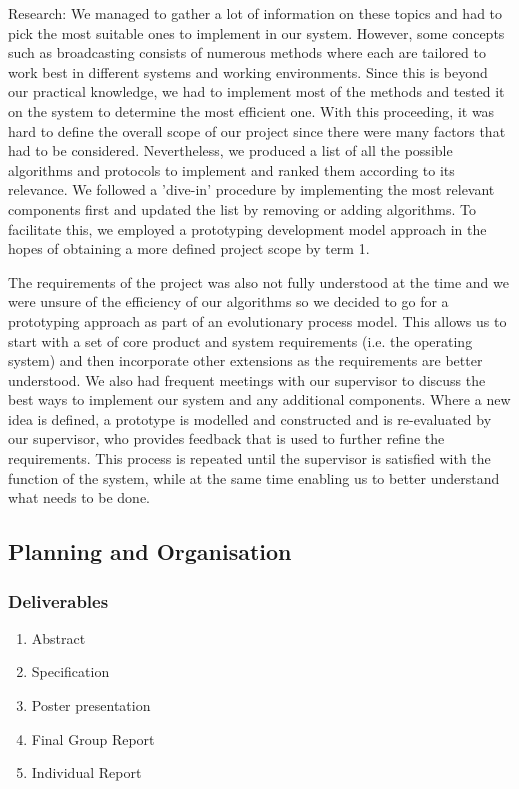 Research: We managed to gather a lot of information on these topics and had to pick the most suitable ones to implement in our system. However, some concepts such as broadcasting consists of numerous methods where each are tailored to work best in different systems and working environments. Since this is beyond our practical knowledge, we had to implement most of the methods and tested it on the system to determine the most efficient one. With this proceeding, it was hard to define the overall scope of our project since there were many factors that had to be considered. Nevertheless, we produced a list of all the possible algorithms and protocols to implement and ranked them according to its relevance. We followed a 'dive-in' procedure by implementing the most relevant components first and updated the list by removing or adding algorithms. To facilitate this, we employed a prototyping development model approach in the hopes of obtaining a more defined project scope by term 1.

The requirements of the project was also not fully understood at the time and we were unsure of the efficiency of our algorithms so we decided to go for a prototyping approach as part of an evolutionary process model. This allows us to start with a set of core product and system requirements (i.e. the operating system) and then incorporate other extensions as the requirements are better understood. We also had frequent meetings with our supervisor to discuss the best ways to implement our system and any additional components. Where a new idea is defined, a prototype is modelled and constructed and is re-evaluated by our supervisor, who provides feedback that is used to further refine the requirements. This process is repeated until the supervisor is satisfied with the function of the system, while at the same time enabling us to better understand what needs to be done.


\subsection{Planning and Organisation}

\subsubsection{Deliverables}

\begin{enumerate}
	\item Abstract
	\item Specification
    \item Poster presentation
    \item Final Group Report
    \item Individual Report
\end{enumerate}


